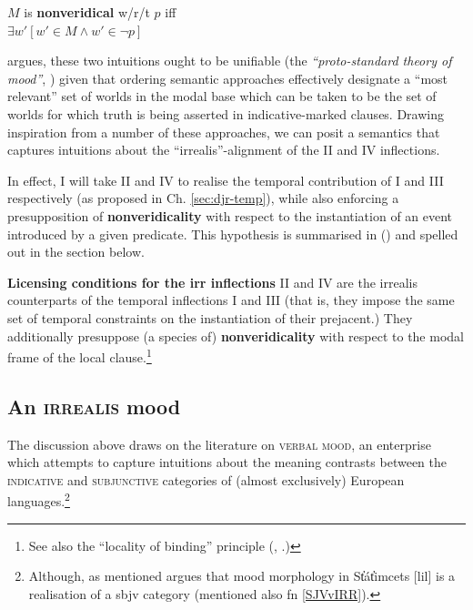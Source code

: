 \pex {}$ \mathit{M} $ is \textbf{nonveridical} w/r/t $ p $ iff\\
$ \exists w' [w'\in\mathit{M}\wedge w'\in\neg p]$
\xe

 \citet[71]{Portner2018a} argues, these two intuitions ought to be unifiable (the \textit{``proto-standard theory of mood''}, \citealp[see also][]{Portner2018,Portner2012}) given that ordering semantic approaches effectively designate a ``most relevant'' set of worlds in the modal base which can be taken to be the set of worlds for which truth is being asserted in indicative-marked clauses. Drawing inspiration from a number of these approaches, we can posit a semantics that captures intuitions about the ``irrealis''-alignment of the \gls{II} and \gls{IV} inflections.


In effect, I will take \gls{II} and \gls{IV} to realise the temporal contribution of \gls{I} and \gls{III} respectively (as proposed in Ch. \ref{sec:djr-temp}), while also enforcing a presupposition of \textbf{nonveridicality} with respect to the instantiation of an event introduced by a given predicate. This hypothesis is summarised in () and spelled out in the section below.

\pex\textbf{Licensing conditions for the \gls{irr} inflections}
\a \gls{II} and \gls{IV} are the irrealis counterparts of the temporal inflections \gls{I} and \gls{III} (that is, they impose the same set of temporal constraints on the instantiation of their prejacent.)
\a They additionally presuppose (a species of) \textbf{nonveridicality} with respect to the modal frame of the local clause.\footnote{See also the ``locality of binding'' principle (\citealp[201]{Percus2000}, 	\citealp[99]{Hacquard2010}.)}
\xe



\subsection{An \textsc{irrealis} mood}
\label{sec:sbjv}

The discussion above draws on the literature on \textsc{verbal mood}, an enterprise which attempts to capture intuitions about the meaning contrasts between the \textsc{indicative} and \textsc{subjunctive} categories of (almost exclusively) European languages.\footnote{Although, as mentioned \citet{Matthewson2010} argues that mood morphology in St̓át̓imcets [\gls{lil}] is a realisation of a \gls{sbjv} category (mentioned also fn \ref{SJVvIRR}).}

